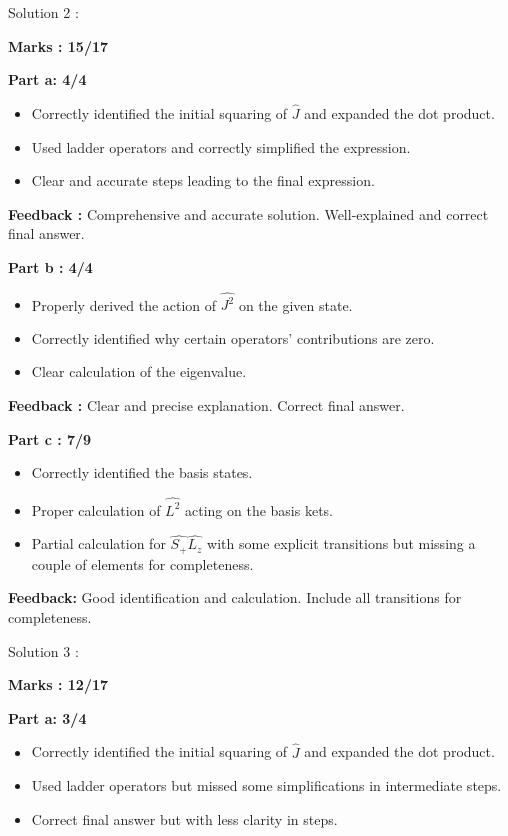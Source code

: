 \documentclass[a4paper,11pt]{article}
\begin{document}
Solution 2 :

\textbf{Marks : 15/17}

\textbf{Part a: 4/4}
\begin{itemize}
    \item Correctly identified the initial squaring of $\hat{J}$ and expanded the dot product.
    \item Used ladder operators and correctly simplified the expression.
    \item Clear and accurate steps leading to the final expression.
\end{itemize}

\textbf{Feedback :}
Comprehensive and accurate solution. Well-explained and correct final answer.


\textbf{Part b : 4/4}
\begin{itemize}
    \item Properly derived the action of $\hat{J^2}$ on the given state.
    \item Correctly identified why certain operators' contributions are zero.
    \item Clear calculation of the eigenvalue.
\end{itemize}

\textbf{Feedback :}
Clear and precise explanation. Correct final answer.


\textbf{Part c : 7/9}
\begin{itemize}
    \item Correctly identified the basis states.
    \item Proper calculation of $\hat{L^2}$ acting on the basis kets.
    \item Partial calculation for $\hat{S_+}\hat{L_z}$ with some explicit transitions but missing a couple of elements for completeness.
\end{itemize}

\textbf{Feedback:}
Good identification and calculation. Include all transitions for completeness.



Solution 3 :

\textbf{Marks : 12/17}

\textbf{Part a: 3/4}
\begin{itemize}
    \item Correctly identified the initial squaring of $\hat{J}$ and expanded the dot product.
    \item Used ladder operators but missed some simplifications in intermediate steps.
    \item Correct final answer but with less clarity in steps.
\end{itemize}
\end{document}
